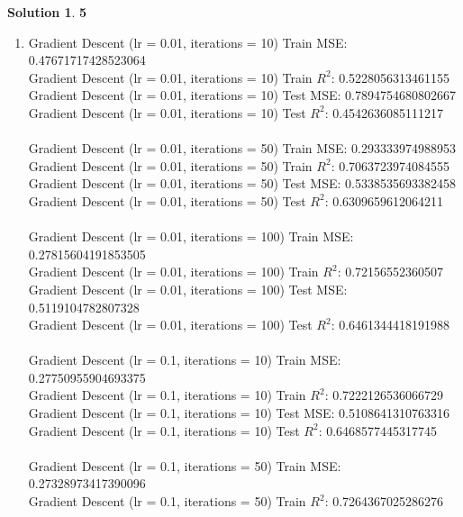 \documentclass[11pt]{article}
\theoremstyle{definition}
\theoremstyle{nopunct}
\newtheorem*{s}{Solution}
\begin{document}
\begin{s}\textbf{5}
    \begin{enumerate}
        \item
        Gradient Descent (lr = 0.01, iterations = 10) Train MSE: 0.47671717428523064 \\
        Gradient Descent (lr = 0.01, iterations = 10) Train $R^2$: 0.5228056313461155 \\
        Gradient Descent (lr = 0.01, iterations = 10) Test MSE: 0.7894754680802667 \\
        Gradient Descent (lr = 0.01, iterations = 10) Test $R^2$: 0.4542636085111217 \\
        \bigskip \\
        Gradient Descent (lr = 0.01, iterations = 50) Train MSE: 0.293333974988953 \\
        Gradient Descent (lr = 0.01, iterations = 50) Train $R^2$: 0.7063723974084555 \\
        Gradient Descent (lr = 0.01, iterations = 50) Test MSE: 0.5338535693382458 \\
        Gradient Descent (lr = 0.01, iterations = 50) Test $R^2$: 0.6309659612064211 \\
        \bigskip \\
        Gradient Descent (lr = 0.01, iterations = 100) Train MSE: 0.27815604191853505 \\
        Gradient Descent (lr = 0.01, iterations = 100) Train $R^2$: 0.72156552360507 \\
        Gradient Descent (lr = 0.01, iterations = 100) Test MSE: 0.5119104782807328 \\
        Gradient Descent (lr = 0.01, iterations = 100) Test $R^2$: 0.6461344418191988 \\
        \bigskip \\
        Gradient Descent (lr = 0.1, iterations = 10) Train MSE: 0.27750955904693375 \\
        Gradient Descent (lr = 0.1, iterations = 10) Train $R^2$: 0.7222126536066729 \\
        Gradient Descent (lr = 0.1, iterations = 10) Test MSE: 0.5108641310763316 \\
        Gradient Descent (lr = 0.1, iterations = 10) Test $R^2$: 0.6468577445317745 \\
        \bigskip \\
        Gradient Descent (lr = 0.1, iterations = 50) Train MSE: 0.27328973417390096 \\
        Gradient Descent (lr = 0.1, iterations = 50) Train $R^2$: 0.7264367025286276 \\

\end{enumerate}
\end{s}
\end{document}
